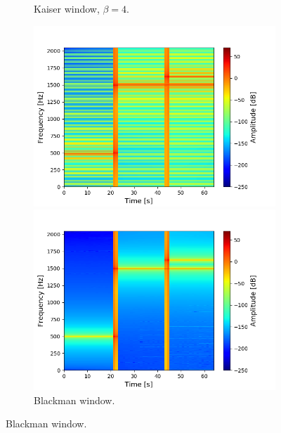 \begin{figure}[H]
\begin{subfigure}{0.49\textwidth}
\caption{Kaiser window, $\beta=4$.}
\label{fig:stft_kaiser_10000_4}
\end{subfigure}
\centering
\begin{subfigure}{0.49\textwidth}
\centering

\includegraphics[width=\textwidth]{figures/stft_windows/bartlett_10000.png}
\caption{Bartlett window.}
\label{fig:stft_bartlett}
\includegraphics[width=\textwidth]{figures/stft_windows/blackman_10000.png}
\caption{Blackman window.}
\label{fig:stft_blackman}

\end{subfigure}
\end{figure}
